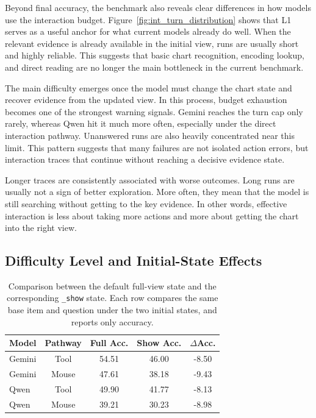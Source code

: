 \documentclass[review,journal,hideappendix]{vgtc} %
\begin{document}
Beyond final accuracy, the benchmark also reveals clear differences in how models use the interaction budget. Figure~\ref{fig:int_turn_distribution} shows that L1 serves as a useful anchor for what current models already do well. When the relevant evidence is already available in the initial view, runs are usually short and highly reliable. This suggests that basic chart recognition, encoding lookup, and direct reading are no longer the main bottleneck in the current benchmark.

The main difficulty emerges once the model must change the chart state and recover evidence from the updated view. In this process, budget exhaustion becomes one of the strongest warning signals. Gemini reaches the turn cap only rarely, whereas Qwen hit it much more often, especially under the direct interaction pathway. Unanswered runs are also heavily concentrated near this limit. This pattern suggests that many failures are not isolated action errors, but interaction traces that continue without reaching a decisive evidence state.

Longer traces are consistently associated with worse outcomes. Long runs are usually not a sign of better exploration. More often, they mean that the model is still searching without getting to the key evidence. In other words, effective interaction is less about taking more actions and more about getting the chart into the right view.

\subsection{Difficulty Level and Initial-State Effects}

\begin{table}[t]
	\centering
	\caption{
		Comparison between the default full-view state and the corresponding \texttt{\_show} state. Each row compares the same base item and question under the two initial states, and reports only accuracy.
	}
	\label{tab:show_effects}
	\begin{tabular}{lcccc}
		\toprule
		Model    &  Pathway & Full Acc. & Show Acc. & $\Delta$Acc. \\
		\midrule
		Gemini   &  Tool       & 54.51     & 46.00     & -8.50      \\
		Gemini   &  Mouse      & 47.61     & 38.18     & -9.43      \\
		Qwen     &  Tool       & 49.90     & 41.77     & -8.13      \\
		Qwen     &  Mouse      & 39.21     & 30.23     & -8.98      \\
		\bottomrule
	\end{tabular}
\end{table}
\end{document}
